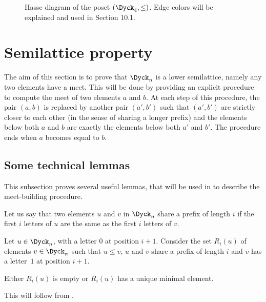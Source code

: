 \begin{figure}[htb]
  \caption{Hasse diagram of the poset $(\Dyck_4, \leq)$. Edge colors will be explained and used in Section 10.1.}
  \label{fig_dyck4}
\end{figure}


\section{Semilattice property}

\label{section-semilattice}

The aim of this section is to prove that $\Dyck_n$ is a lower
semilattice, namely any two elements have a meet. This will be done by
providing an explicit procedure to compute the meet of two elements
$a$ and $b$. At each step of this procedure, the pair $(a,b)$ is
replaced by another pair $(a',b')$ such that $(a',b')$ are strictly closer to
each other (in the sense of sharing a longer prefix) and the elements below both $a$ and $b$ are
exactly the elements below both $a'$ and $b'$. The procedure ends when $a$
becomes equal to $b$.

\subsection{Some technical lemmas}

This subsection proves several useful lemmas, that will be used in
 to describe the meet-building procedure.

Let us say that two elements $u$ and $v$ in $\Dyck_n$ share a prefix
of length $i$ if the first $i$ letters of $u$ are the same as the
first $i$ letters of $v$.

\begin{lemma}
  \label{forcer_un}
  Let $u \in \Dyck_n$, with a letter $0$ at position $i+1$. Consider
  the set $R_i(u)$ of elements $v \in \Dyck_n$ such that $u \leq v$,
  $u$ and $v$ share a prefix of length $i$ and $v$ has a letter~$1$ at
  position $i+1$.

  Either $R_i(u)$ is empty or $R_i(u)$ has a unique minimal element.
\end{lemma}
This will follow from .

